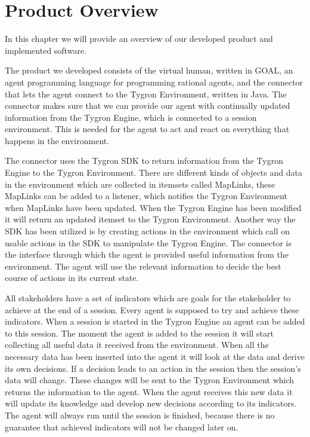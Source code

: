 \chapter[Overview of the software product]{Product Overview}

In this chapter we will provide an overview of our developed product and implemented software.

The product we developed consists of the virtual human, written in GOAL, an agent programming language for programming rational agents, and the connector that lets the agent connect to the Tygron Environment, written in Java. The connector makes sure that we can provide our agent with continually updated information from the Tygron Engine, which is connected to a session environment. This is needed for the agent to act and react on everything that happens in the environment.

The connector uses the Tygron SDK to return information from the Tygron Engine to the Tygron Environment. There are different kinds of objects and data in the environment which are collected in itemsets called MapLinks, these MapLinks can be added to a listener, which notifies the Tygron Environment when MapLinks have been updated. When the Tygron Engine has been modified it will return an updated itemset to the Tygron Environment. Another way the SDK has been utilized is by creating actions in the environment which call on usable actions in the SDK to manipulate the Tygron Engine. The connector is the interface through which the agent is provided useful information from the environment. The agent will use the relevant information to decide the best course of actions in its current state.

All stakeholders have a set of indicators which are goals for the stakeholder to achieve at the end of a session. Every agent is supposed to try and achieve these indicators. When a session is started in the Tygron Engine an agent can be added to this session. The moment the agent is added to the session it will start collecting all useful data it received from the environment. When all the necessary data has been inserted into the agent it will look at the data and derive its own decisions. If a decision leads to an action in the session then the session's data will change. These changes will be sent to the Tygron Environment which returns the information to the agent. When the agent receives this new data it will update its knowledge and develop new decisions according to its indicators. The agent will always run until the session is finished, because there is no guarantee that achieved indicators will not be changed later on.

\newpage